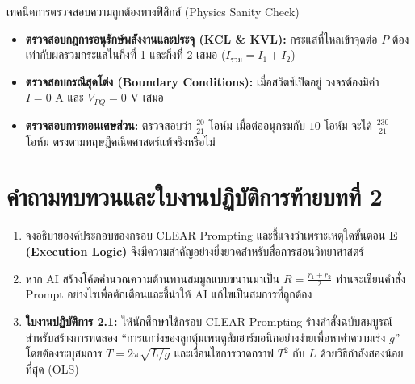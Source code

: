 \begin{tipbox}{เทคนิคการตรวจสอบความถูกต้องทางฟิสิกส์ (Physics Sanity Check)}
\begin{itemize}[leftmargin=1.5em, itemsep=2pt]
    \item \textbf{ตรวจสอบกฎการอนุรักษ์พลังงานและประจุ (KCL \& KVL):} กระแสที่ไหลเข้าจุดต่อ $P$ ต้องเท่ากับผลรวมกระแสในกิ่งที่ 1 และกิ่งที่ 2 เสมอ ($I_{\text{รวม}} = I_1 + I_2$)
    \item \textbf{ตรวจสอบกรณีสุดโต่ง (Boundary Conditions):} เมื่อสวิตช์เปิดอยู่ วงจรต้องมีค่า $I = 0\text{ A}$ และ $V_{PQ} = 0\text{ V}$ เสมอ
    \item \textbf{ตรวจสอบการทอนเศษส่วน:} ตรวจสอบว่า $\frac{20}{21}$ โอห์ม เมื่อต่ออนุกรมกับ $10$ โอห์ม จะได้ $\frac{230}{21}$ โอห์ม ตรงตามทฤษฎีคณิตศาสตร์แท้จริงหรือไม่
\end{itemize}
\end{tipbox}

\section*{คำถามทบทวนและใบงานปฏิบัติการท้ายบทที่ 2}

\begin{enumerate}[leftmargin=1.5em, itemsep=8pt]
    \item จงอธิบายองค์ประกอบของกรอบ CLEAR Prompting และชี้แจงว่าเพราะเหตุใดขั้นตอน \textbf{E (Execution Logic)} จึงมีความสำคัญอย่างยิ่งยวดสำหรับสื่อการสอนวิทยาศาสตร์
    \item หาก AI สร้างโค้ดคำนวณความต้านทานสมมูลแบบขนานมาเป็น $R = \frac{r_1 + r_2}{2}$ ท่านจะเขียนคำสั่ง Prompt อย่างไรเพื่อตักเตือนและชี้นำให้ AI แก้ไขเป็นสมการที่ถูกต้อง
    \item \textbf{ใบงานปฏิบัติการ 2.1:} ให้นักศึกษาใช้กรอบ CLEAR Prompting ร่างคำสั่งฉบับสมบูรณ์สำหรับสร้างการทดลอง “การแกว่งของลูกตุ้มเพนดูลัมฮาร์มอนิกอย่างง่ายเพื่อหาค่าความเร่ง $g$” โดยต้องระบุสมการ $T = 2\pi\sqrt{L/g}$ และเงื่อนไขการวาดกราฟ $T^2$ กับ $L$ ด้วยวิธีกำลังสองน้อยที่สุด (OLS)
\end{enumerate}
